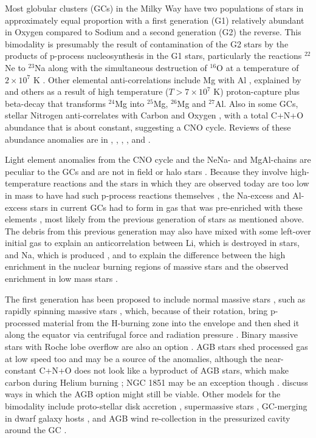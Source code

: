 \documentclass[12pt,preprint]{aastex}
\begin{document}
Most globular clusters (GCs) in the Milky Way have two populations of stars in
approximately equal proportion with a first generation (G1) relatively abundant in
Oxygen compared to Sodium and a second generation (G2) the reverse. This bimodality
is presumably the result of contamination of the G2 stars by the products of
p-process nucleosynthesis in the G1 stars, particularly the reactions $^{22}$Ne to
$^{23}$Na along with the simultaneous destruction of $^{16}$O at a temperature of
$2\times10^7$ K \citep{den90, dec07a}. Other elemental anti-correlations include Mg
with Al \citep[e.g.,][]{carretta14}, explained by \cite{langer93} and others as a
result of high temperature ($T>7\times10^7$ K) proton-capture plus beta-decay that
transforms $^{24}$Mg into $^{25}$Mg, $^{26}$Mg and $^{27}$Al. Also in some GCs,
stellar Nitrogen anti-correlates with Carbon and Oxygen \citep{dickens91}, with a
total C+N+O abundance that is about constant, suggesting a CNO cycle. Reviews of
these abundance anomalies are in \cite{gratton04}, \cite{char05}, \cite{gratton12},
\cite{renzini15}, and \cite{bastian15}.

Light element anomalies from the CNO cycle and the NeNa- and MgAl-chains are
peculiar to the GCs and are not in field or halo stars \citep{gratton00, char05,
prantzos06}. Because they involve high-temperature reactions and the stars in which
they are observed today are too low in mass to have had such p-process reactions
themselves \citep{gratton01}, the Na-excess and Al-excess stars in current GCs had
to form in gas that was pre-enriched with these elements \citep{cottrell81}, most
likely from the previous generation of stars as mentioned above. The debris from
this previous generation may also have mixed with some left-over initial gas to
explain an anticorrelation between Li, which is destroyed in stars, and Na, which
is produced \citep{pasquini05, bonifacio07, dec07a}, and to explain the difference
between the high enrichment in the nuclear burning regions of massive stars and the
observed enrichment in low mass stars \citep[][table 4]{dec07b}.

The first generation has been proposed to include normal massive stars
\citep{cottrell81}, such as rapidly spinning massive stars \citep{prantzos06},
which, because of their rotation, bring p-processed material from the H-burning
zone into the envelope and then shed it along the equator via centrifugal force and
radiation pressure \citep{prantzos06, dec07b}. Binary massive stars with Roche lobe
overflow are also an option \citep{demink09}. AGB stars \citep{dercole08} shed
processed gas at low speed too and may be a source of the anomalies, although the
near-constant C+N+O does not look like a byproduct of AGB stars, which make carbon
during Helium burning \citep{char05}; NGC 1851 may be an exception though
\citep{yong14,simpson16}.  \cite{renzini15} discuss ways in which the AGB option
might still be viable. Other models for the bimodality include proto-stellar disk
accretion \citep{bastian13a}, supermassive stars \citep{denis14,denis15},
GC-merging in dwarf galaxy hosts \citep{bekki16}, and AGB wind re-collection in the
pressurized cavity around the GC \citep{dercole16}.
\end{document}
